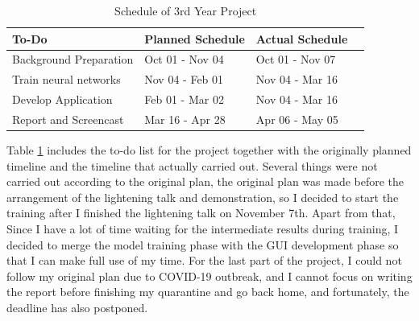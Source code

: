 \begin{table}
    \begin{center}
    \begin{tabular}{|l|l|l|l|}\hline\hline
    To-Do&Planned Schedule&Actual Schedule\\
    \hline
    Background Preparation&Oct 01 - Nov 04&Oct 01 - Nov 07\\
    Train neural networks&Nov 04 - Feb 01&Nov 04 - Mar 16\\
    Develop Application&Feb 01 - Mar 02&Nov 04 - Mar 16\\
    Report and Screencast&Mar 16 - Apr 28&Apr 06 - May 05\\
    \hline\hline
    \end{tabular}
    \end{center}
    \caption{Schedule of 3rd Year Project}
    \label{milestones table}
\end{table}

Table \ref{milestones table} includes the to-do list for the project together with 
the originally planned timeline and the timeline that actually carried out. Several things 
were not carried out according to the original plan, the original plan was made 
before the arrangement of the lightening talk and demonstration, so I decided to start 
the training after I finished the lightening talk on November 7th. Apart from that, 
Since I have a lot of time waiting for the intermediate results during training, I decided
to merge the model training phase with the GUI development phase so that I can make 
full use of my time. For the last part of the project, I could not follow my original 
plan due to COVID-19 outbreak, and I cannot focus on writing the report before finishing
my quarantine and go back home, and fortunately, the deadline has also postponed.

